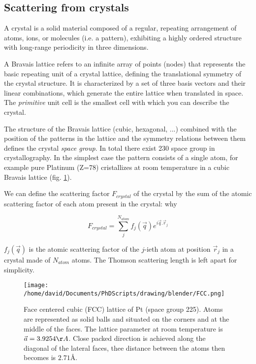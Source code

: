 \subsection{Scattering from crystals}

A crystal is a solid material composed of a regular, repeating arrangement of atoms, ions, or molecules (i.e. a pattern), exhibiting a highly ordered structure with long-range periodicity in three dimensions.

A Bravais lattice refers to an infinite array of points (nodes) that represents the basic repeating unit of a crystal lattice, defining the translational symmetry of the crystal structure.
It is characterized by a set of three basis vectors and their linear combinations, which generate the entire lattice when translated in space.
The \textit{primitive} unit cell is the smallest cell with which you can describe the crystal.

The structure of the Bravais lattice (cubic, hexagonal, ...) combined with the position of the patterns in the lattice and the symmetry relations between them defines the crystal \textit{space group}.
In total there exist 230 space group in crystallography.
In the simplest case the pattern consists of a single atom, for example pure Platinum (Z=78) cristallizes at room temperature in a cubic Bravais lattice (fig. \ref{fig:fcc}).

We can define the scattering factor $F_{crystal}$ of the crystal by the sum of the atomic scattering factor of each atom present in the crystal: \textcolor{Important}{why}

\begin{equation}
    F_{crystal} = \sum_j^{N_{atom}} f_j(\vec{q}) e^{i\vec{q}.\vec{r}_j}
\end{equation}

$f_j(\vec{q})$ is the atomic scattering factor of the $j$-ieth atom at position $\vec{r}_j$ in a crystal made of $N_{atom}$ atoms.
The Thomson scattering length is left apart for simplicity.

\begin{figure}[!htb]
    \centering
    \texttt{[image: /home/david/Documents/PhDScripts/drawing/blender/FCC.png]}
    \caption{Face centered cubic (FCC) lattice of Pt (space group 225). Atoms are represented as solid balls and situated on the corners and at the middle of the faces. The lattice parameter at room temperature is $\vec{a} = 3.9254 \AA$. Close packed direction is achieved along the diagonal of the lateral faces, thee distance between the atoms then becomes is $2.71 \si{\angstrom}.$}
    \label{fig:fcc}
\end{figure}

